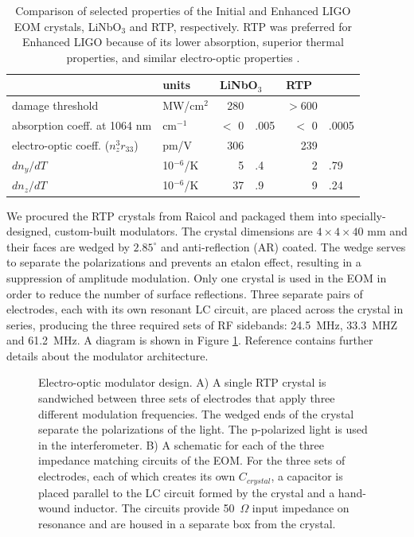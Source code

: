 \begin{table}
\centering
\caption[Comparison of selected properties of the Initial and Enhanced
LIGO EOM crystals]{Comparison of selected properties of the Initial and Enhanced
  LIGO EOM crystals, LiNbO$_3$ and RTP, respectively. RTP was
  preferred for Enhanced LIGO because of its lower absorption,
  superior thermal properties, and similar 
  electro-optic properties \citep{UFLIGOGroup2006Upgrading}.}  
\begin{tabular}{l l r@{}l r@{}l}
\hline
 & units & \multicolumn{2}{l}{LiNbO$_3$} & \multicolumn{2}{l}{RTP} \\
\hline
damage threshold & MW/cm$^2$ & 280 & & $>$600 & \\
absorption coeff. at 1064 nm & cm$^{-1}$ & $<$ 0 & .005 & $<$ 0 & .0005 \\
electro-optic coeff. ($n_z^3 r_{33}$) & pm/V & 306 & & 239 & \\
$dn_y/dT$ & 10$^{-6}$/K & 5 & .4 & 2 & .79 \\
$dn_z/dT$ & 10$^{-6}$/K & 37 & .9 & 9 & .24 \\
\hline
\end{tabular}
\label{tab:EOMcrystals}
\end{table}

We procured the RTP crystals from Raicol and packaged them into
specially-designed, custom-built modulators. The crystal dimensions are
$4 \times 4 \times 40$ mm and their faces are wedged by $2.85^\circ$
and anti-reflection (AR) coated. The wedge serves to separate the
polarizations and prevents an etalon effect, resulting in a
suppression of amplitude modulation. Only one crystal is used in the
EOM in order to reduce the number of surface reflections. Three
separate pairs of electrodes, each with its own resonant LC circuit,
are placed across the crystal in series, producing the three required
sets of RF sidebands: 24.5~MHz, 33.3~MHZ and 61.2~MHz. A diagram is
shown in Figure \ref{fig:EOM}. Reference
\citep{Quetschke2008ElectroOptic} contains further details about the
modulator architecture.

\begin{figure}
\begin{centering}
  \caption[Electro-optic modulator design]{Electro-optic modulator
    design. A) A single RTP crystal is sandwiched between three sets
    of electrodes that apply three different modulation
    frequencies. The wedged ends of the crystal separate the
    polarizations of the light. The p-polarized light is used in the
    interferometer. B) A schematic for each of the three impedance
    matching circuits of the EOM. For the three sets of electrodes,
    each of which creates its own $C_{crystal}$, a capacitor is placed
    parallel to the LC circuit formed by the crystal and a hand-wound
    inductor.  The circuits provide 50~$\Omega$ input impedance on
    resonance and are housed in a separate box from the crystal.}
\label{fig:EOM}
\end{centering}
\end{figure}

